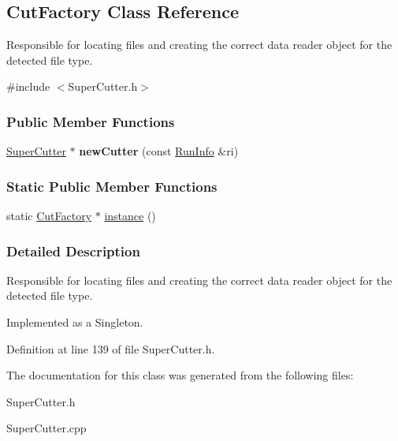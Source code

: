 \hypertarget{classCutFactory}{
\subsection{CutFactory Class Reference}
\label{classCutFactory}
}


Responsible for locating files and creating the correct data reader object for the detected file type.  




{\ttfamily \#include $<$SuperCutter.h$>$}

\subsubsection*{Public Member Functions}
\begin{DoxyCompactItemize}
\item 
\hypertarget{classCutFactory_a521335d9a469768d33768786aecf33fb}{
\hyperlink{classSuperCutter}{SuperCutter} $\ast$ {\bfseries newCutter} (const \hyperlink{classRunInfo}{RunInfo} \&ri)}
\label{classCutFactory_a521335d9a469768d33768786aecf33fb}

\end{DoxyCompactItemize}
\subsubsection*{Static Public Member Functions}
\begin{DoxyCompactItemize}
\item 
\hypertarget{classCutFactory_a457083853ded569db341d1b8603e021c}{
static \hyperlink{classCutFactory}{CutFactory} $\ast$ \hyperlink{classCutFactory_a457083853ded569db341d1b8603e021c}{instance} ()}
\label{classCutFactory_a457083853ded569db341d1b8603e021c}

\end{DoxyCompactItemize}


\subsubsection{Detailed Description}
Responsible for locating files and creating the correct data reader object for the detected file type. 

Implemented as a Singleton. 

Definition at line 139 of file SuperCutter.h.



The documentation for this class was generated from the following files:\begin{DoxyCompactItemize}
\item 
SuperCutter.h\item 
SuperCutter.cpp\end{DoxyCompactItemize}
